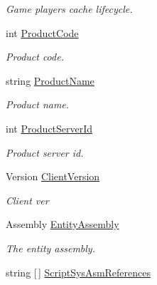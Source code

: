 \begin{DoxyCompactItemize}
\begin{DoxyCompactList}\small\item\em Game players cache lifecycle. \end{DoxyCompactList}\item 
int \mbox{\hyperlink{class_t_net_1_1_runtime_1_1_zone_setting_af2b53538cf6c9e13be0449ffc19a76b2}{Product\+Code}}
\begin{DoxyCompactList}\small\item\em Product code. \end{DoxyCompactList}\item 
string \mbox{\hyperlink{class_t_net_1_1_runtime_1_1_zone_setting_acc5798e8414ae1c0db37665010870fca}{Product\+Name}}
\begin{DoxyCompactList}\small\item\em Product name. \end{DoxyCompactList}\item 
int \mbox{\hyperlink{class_t_net_1_1_runtime_1_1_zone_setting_aefb770cf3d44677be77da4a3eb9f0af7}{Product\+Server\+Id}}
\begin{DoxyCompactList}\small\item\em Product server id. \end{DoxyCompactList}\item 
Version \mbox{\hyperlink{class_t_net_1_1_runtime_1_1_zone_setting_a8710e2548405c4878201540fae2878ad}{Client\+Version}}
\begin{DoxyCompactList}\small\item\em Client ver \end{DoxyCompactList}\item 
Assembly \mbox{\hyperlink{class_t_net_1_1_runtime_1_1_zone_setting_a0b69e82568b1f595e09d6cbc962c7ccb}{Entity\+Assembly}}
\begin{DoxyCompactList}\small\item\em The entity assembly. \end{DoxyCompactList}\item 
string \mbox{[}$\,$\mbox{]} \mbox{\hyperlink{class_t_net_1_1_runtime_1_1_zone_setting_a804e0001616fe0b92e61d983fa1ba1b2}{Script\+Sys\+Asm\+References}}

\end{DoxyCompactItemize}
